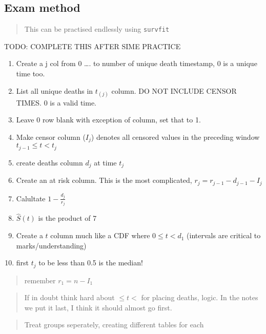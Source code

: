 \documentclass[
  letterpaper,
  DIV=11,
  numbers=noendperiod]{scrreprt}
\providecommand{\tightlist}{%
  \setlength{\itemsep}{0pt}\setlength{\parskip}{0pt}}\usepackage{longtable,booktabs,array}
\begin{document}
\hypertarget{exam-method}{%
\subsection{Exam method}\label{exam-method}}

\begin{quote}
This can be practised endlessly using \texttt{survfit}
\end{quote}

TODO: COMPLETE THIS AFTER SIME PRACTICE

\begin{enumerate}
\def\labelenumi{\arabic{enumi})}
\tightlist
\item
  Create a j col from 0 \ldots. to number of unique death timestamp, 0
  is a unique time too.
\item
  List all unique deaths in \(t_{(j)}\) column. DO NOT INCLUDE CENSOR
  TIMES. 0 is a valid time.
\item
  Leave 0 row blank with exception of  column, set that to 1.
\item
  Make censor column (\(I_j\)) denotes all censored values in the
  preceding window \(t_{j-1} \leq t < t_j\)
\item
  create deaths column \(d_j\) at time \(t_j\)
\item
  Create an at risk column. This is the most complicated,
  \(r_j = r_{j-1} - d_{j-1} - I_j\)
\item
  Calultate \(1 - \frac{d_j}{r_j}\)
\item
  \(\hat{S}(t)\) is the product of 7
\item
  Create a \(t\) column much like a CDF where \(0 \leq t < d_1\)
  (intervals are critical to marks/understanding)
\item
  first \(t_j\) to be less than 0.5 is the median!
\end{enumerate}

\begin{quote}
remember \(r_1 = n - I_1\)
\end{quote}

\begin{quote}
If in doubt think hard about \(\leq t <\) for placing deaths, logic. In
the notes we put it last, I think it should almost go first.
\end{quote}

\begin{quote}
Treat groups seperately, creating different tables for each
\end{quote}
\end{document}
